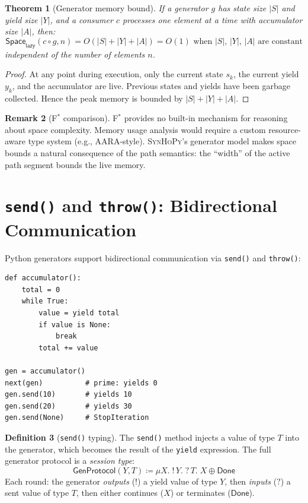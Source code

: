 \documentclass[11pt,a4paper]{report}
\theoremstyle{definition}
\newtheorem{definition}{Definition}[chapter]
\newtheorem{remark}[definition]{Remark}
\theoremstyle{plain}
\newtheorem{theorem}[definition]{Theorem}
\newcommand{\defeq}{\coloneqq}
\newcommand{\fstar}{F$^{*}$}
\newcommand{\synhopy}{\textsc{SynHoPy}}
\begin{document}
\begin{theorem}[Generator memory bound]
If a generator $g$ has state size $|S|$ and yield size $|Y|$,
and a consumer $c$ processes one element at a time with accumulator
size $|A|$, then:
\[
  \mathsf{Space}_{\mathsf{lazy}}(c \circ g, n)
  = O(|S| + |Y| + |A|)
  = O(1) \text{ when $|S|$, $|Y|$, $|A|$ are constant}
\]
independent of the number of elements $n$.
\end{theorem}
\begin{proof}
At any point during execution, only the current state $s_k$, the current
yield $y_k$, and the accumulator are live.  Previous states and yields
have been garbage collected.  Hence the peak memory is bounded by
$|S| + |Y| + |A|$.
\end{proof}

\begin{remark}[\fstar{} comparison]
\fstar{} provides no built-in mechanism for reasoning about space complexity.
Memory usage analysis would require a custom resource-aware type system
(e.g., AARA-style).  \synhopy{}'s generator model makes space bounds
a natural consequence of the path semantics: the ``width'' of the active
path segment bounds the live memory.
\end{remark}

\section{\texttt{send()} and \texttt{throw()}: Bidirectional Communication}

Python generators support bidirectional communication via \texttt{send()}
and \texttt{throw()}:

\begin{lstlisting}[style=python]
def accumulator():
    total = 0
    while True:
        value = yield total
        if value is None:
            break
        total += value

gen = accumulator()
next(gen)          # prime: yields 0
gen.send(10)       # yields 10
gen.send(20)       # yields 30
gen.send(None)     # StopIteration
\end{lstlisting}

\begin{definition}[\texttt{send()} typing]
The \texttt{send()} method injects a value of type $T$ into the generator,
which becomes the result of the \texttt{yield} expression.  The full
generator protocol is a \emph{session type}:
\[
  \mathsf{GenProtocol}(Y, T) \defeq \mu X.\;
    !\,Y.\; ?\,T.\; X \oplus \mathsf{Done}
\]
Each round: the generator \emph{outputs} ($!$) a yield value of type $Y$,
then \emph{inputs} ($?$) a sent value of type $T$, then either continues
($X$) or terminates ($\mathsf{Done}$).
\end{definition}
\end{document}
